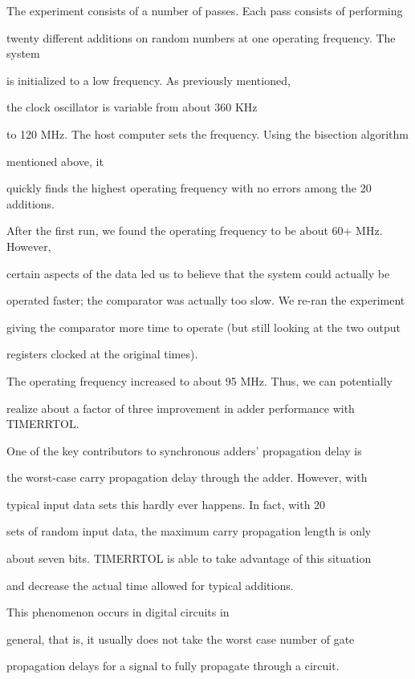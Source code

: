 \documentclass[12pt,dvips]{article}
\begin{document}
The experiment consists of a number of passes. Each pass consists of performing

twenty different additions on random numbers at one operating frequency. The system

is initialized to a low frequency. As previously mentioned,

the clock oscillator is variable from about 360 KHz

to 120 MHz. The host computer sets the frequency. Using the bisection algorithm

mentioned above, it

quickly finds the highest operating frequency with no errors among the 20 additions.



After the first run, we found the operating frequency to be about 60+ MHz. However,

certain aspects of the data led us to believe that the system could actually be

operated faster; the comparator was actually too slow. We re-ran the experiment

giving the comparator more time to operate (but still looking at the two output

registers clocked at the original times).

The operating frequency increased to about 95 MHz. Thus, we can potentially

realize about a factor of three improvement in adder performance with TIMERRTOL.



One of the key contributors to synchronous adders' propagation delay is

the worst-case carry propagation delay through the adder. However, with

typical input data sets this hardly ever happens. In fact, with 20

sets of random input data, the maximum carry propagation length is only

about seven bits. TIMERRTOL is able to take advantage of this situation

and decrease the actual time allowed for typical additions.

This phenomenon occurs in digital circuits in

general, that is, it usually does not take the worst case number of gate

propagation delays for a signal to fully propagate through a circuit.
\end{document}
